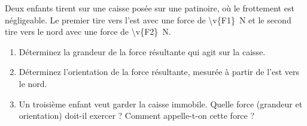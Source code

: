 Deux enfants tirent sur une caisse posée sur une patinoire, où le frottement est négligeable. Le premier tire vers l'est avec une force de \qty{\v{F1}}{N} et le second tire vers le nord avec une force de \qty{\v{F2}}{N}.

\begin{enumerate}[label=\alph*)]
    \item Déterminez la grandeur de la force résultante qui agit sur la caisse.
    \item Déterminez l'orientation de la force résultante, mesurée à partir de l'est vers le nord.
    \item Un troisième enfant veut garder la caisse immobile. Quelle force (grandeur et orientation) doit-il exercer ? Comment appelle-t-on cette force ?
\end{enumerate}
